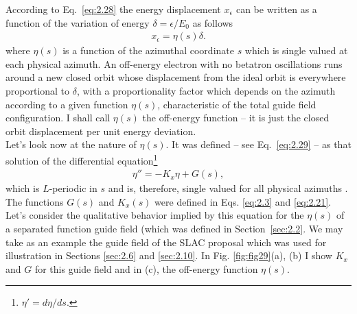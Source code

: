 According to Eq.~\eqref{eq:2.28} the energy displacement $x_\epsilon$ can be written as a function of the variation of energy $\delta = \epsilon/E_0$ as follows
\begin{align} \label{eq:3.3}
	x_\epsilon = \eta(s) \delta.
\end{align}
where $\eta(s)$ is a function of the azimuthal coordinate $s$ which is single valued at
each physical azimuth. An off-energy electron with no betatron oscillations runs around a new closed orbit whose displacement from the ideal orbit is everywhere proportional to $\delta$, with a proportionality factor which depends on the azimuth according to a given function $\eta(s)$, characteristic of the total guide field configuration. I shall call $\eta(s)$ the off-energy function -- it is just the closed orbit displacement per unit energy deviation.\\
Let’s look now at the nature of $\eta(s)$. It was defined -- see Eq.~\eqref{eq:2.29} -- as that
solution of the differential equation\footnote{$\eta' = d\eta/ds.$}
\begin{align}\label{eq:3.4}
	\eta'' = -K_x\eta + G(s),
\end{align}
which is $L$-periodic in $s$ and is, therefore, single valued for all physical azimuths . The functions $G(s)$ and $K_x(s)$ were defined in Eqs. \eqref{eq:2.3} and \eqref{eq:2.21}.\\
Let’s consider the qualitative behavior implied by this equation for the $\eta(s)$ of a separated function guide field (which was defined in Section~\ref{sec:2.2}. We may take
as an example the guide field of the SLAC proposal which was used for illustration in Sections \ref{sec:2.6} and \ref{sec:2.10}. In Fig. \ref{fig:fig29}(a), (b) I show $K_x$ and $G$ for this guide field and in (c), the off-energy function $\eta(s)$.
